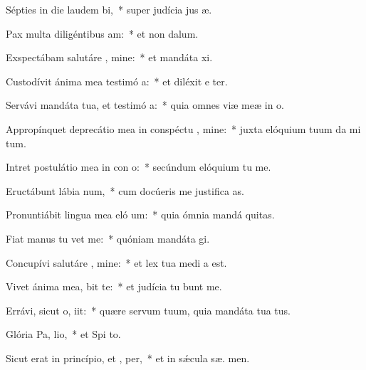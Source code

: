 \item Sépties in die laudem  bi,~* super judícia jus æ.
\item Pax multa diligéntibus  am:~* et non   dalum.
\item Exspectábam salutáre , mine:~* et mandáta  xi.
\item Custodívit ánima mea testimó a:~* et diléxit e ter.
\item Servávi mandáta tua, et testimó a:~* quia omnes viæ meæ in  o.
\item Appropínquet deprecátio mea in conspéctu , mine:~* juxta elóquium tuum da mi tum.
\item Intret postulátio mea in con o:~* secúndum elóquium tu  me.
\item Eructábunt lábia  num,~* cum docúeris me justifica as.
\item Pronuntiábit lingua mea eló um:~* quia ómnia mandá  quitas.
\item Fiat manus tu  vet me:~* quóniam mandáta  gi.
\item Concupívi salutáre , mine:~* et lex tua medi a est.
\item Vivet ánima mea,  bit te:~* et judícia tu bunt me.
\item Errávi, sicut o,  iit:~* quære servum tuum, quia mandáta tua   tus.
\item Glória Pa,  lio,~* et Spi to.
\item Sicut erat in princípio, et ,  per,~* et in sǽcula sæ. men.
